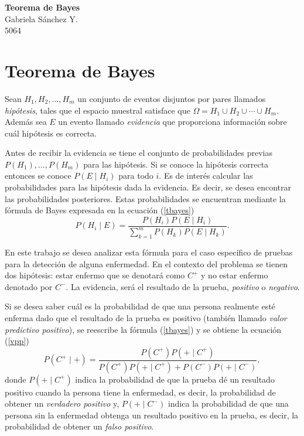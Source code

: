 \documentclass[12pt]{article}
\begin{document}
	\thispagestyle{empty}

	\begin{center}
		{\Large \bf Teorema de Bayes}\\
		Gabriela S\'anchez Y.\\
		5064
	\end{center}
  
	\section{Teorema de Bayes}
	
	Sean $H_1, H_2, \ldots, H_m$ un conjunto de eventos disjuntos por pares llamados {\em hipótesis}, tales que el espacio muestral satisface que $\Omega = H_1 \cup H_2 \cup \cdots \cup H_m$. Además sea $E$ un evento llamado {\em evidencia} que proporciona información sobre cuál hipótesis es correcta. 
	
	Antes de recibir la evidencia se tiene el conjunto de probabilidades previas $P(H_1), \ldots, P(H_m)$ para las hipótesis. Si se conoce la hipótesis correcta entonces se conoce $P(E\mid H_i)$ para todo $i$. Es de interés calcular las probabilidades para las hipótesis dada la evidencia. Es decir, se desea encontrar las probabilidades posteriores. Estas probabilidades se encuentran mediante la fórmula de Bayes \cite{prob2003} expresada en la ecuación (\ref{tbayes})
	\begin{equation}
	P(H_i \mid E) = \frac{P(H_i)P(E\mid H_i)}{\sum_{k=1}^{m} P(H_k)P(E\mid H_k)}.
	\label{tbayes}
	\end{equation} 
	
	En este trabajo se desea analizar esta fórmula para el caso específico de pruebas para la detección de alguna enfermedad. En el contexto del problema se tienen dos hipótesis: estar enfermo que se denotará como $C^+$ y no estar enfermo denotado por $C^-$. La evidencia, será el resultado de la prueba, {\em positivo} o {\em negativo}. 
	
	Si se desea saber cuál es la probabilidad de que una persona realmente esté enferma dado que el resultado de la prueba es positivo (también llamado {\em valor predictivo positivo}), se reescribe la fórmula (\ref{tbayes}) y se obtiene la ecuación (\ref{vpp})
	\begin{equation}
	P(C^+ \mid +) = \frac{P(C^+)P(+ \mid C^+)}{P(C^+)P(+ \mid C^+) + P(C^-) P(+ \mid C^-)},
	\label{vpp}
	\end{equation}
	donde $P(+ \mid C^+)$ indica la probabilidad de que la prueba dé un resultado positivo cuando la persona tiene la enfermedad, es decir, la probabilidad de obtener un {\em verdadero positivo} y, $P(+ \mid C^-)$ indica la probabilidad de que una persona sin la enfermedad obtenga un resultado positivo en la prueba, es decir, la probabilidad de obtener un {\em falso positivo}.
	
\end{document}
